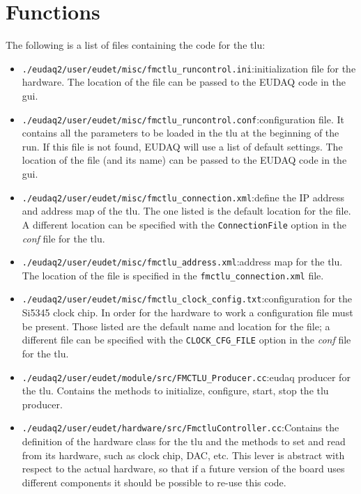 \chapter{Functions}\label{ch:functions}
The following is a list of files containing the code for the \gls{tlu}:
\begin{itemize}
  \item \verb|./eudaq2/user/eudet/misc/fmctlu_runcontrol.ini|:\newline initialization file for the hardware. The location of the file can be passed to the EUDAQ code in the \gls{gui}.
  \item \verb|./eudaq2/user/eudet/misc/fmctlu_runcontrol.conf|:\newline configuration file. It contains all the parameters to be loaded in the \gls{tlu} at the beginning of the run. If this file is not found, EUDAQ will use a list of default settings. The location of the file (and its name) can be passed to the EUDAQ code in the \gls{gui}.
  \item \verb|./eudaq2/user/eudet/misc/fmctlu_connection.xml|:\newline define the IP address and address map of the \gls{tlu}. The one listed is the default location for the file. A different location can be specified with the \verb|ConnectionFile| option in the \emph{conf} file for the \gls{tlu}.
  \item \verb|./eudaq2/user/eudet/misc/fmctlu_address.xml|:\newline address map for the \gls{tlu}. The location of the file is specified in the \verb|fmctlu_connection.xml| file.
  \item \verb|./eudaq2/user/eudet/misc/fmctlu_clock_config.txt|:\newline configuration for the Si5345 clock chip. In order for the hardware to work a configuration file must be present. Those listed are the default name and location for the file; a different file can be specified with the \verb|CLOCK_CFG_FILE| option in the \emph{conf} file for the \gls{tlu}.
  \item \verb|./eudaq2/user/eudet/module/src/FMCTLU_Producer.cc|:\newline eudaq producer for the \gls{tlu}. Contains the methods to initialize, configure, start, stop the \gls{tlu} producer.
  \item \verb|./eudaq2/user/eudet/hardware/src/FmctluController.cc|:\newline Contains the definition of the hardware class for the \gls{tlu} and the methods to set and read from its hardware, such as clock chip, DAC, etc. This lever is abstract with respect to the actual hardware, so that if a future version of the board uses different components it should be possible to re-use this code.

\end{itemize}

